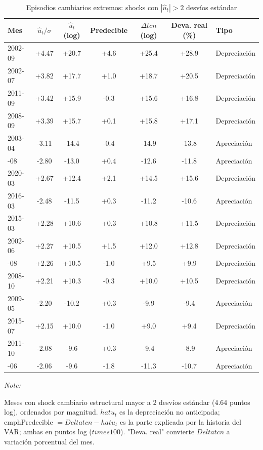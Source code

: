 \begin{table}[!h]
\centering
\caption{\label{tab:episodios}Episodios cambiarios extremos: shocks con $|\hat u_t| > 2$ desvíos estándar}
\centering
\fontsize{8}{10}\selectfont
\begin{threeparttable}
\begin{tabular}[t]{lcccccl}
\toprule
Mes & $\hat u_t/\sigma$ & $\hat u_t$ (log) & Predecible & $\Delta tcn$ (log) & Deva. real (\%) & Tipo\\
\midrule
2002-09 & +4.47 & +20.7 & +4.6 & +25.4 & +28.9 & Depreciación\\
2002-07 & +3.82 & +17.7 & +1.0 & +18.7 & +20.5 & Depreciación\\
2011-09 & +3.42 & +15.9 & -0.3 & +15.6 & +16.8 & Depreciación\\
2008-09 & +3.39 & +15.7 & +0.1 & +15.8 & +17.1 & Depreciación\\
2003-04 & -3.11 & -14.4 & -0.4 & -14.9 & -13.8 & Apreciación\\
\addlinespace
2002-08 & -2.80 & -13.0 & +0.4 & -12.6 & -11.8 & Apreciación\\
2020-03 & +2.67 & +12.4 & +2.1 & +14.5 & +15.6 & Depreciación\\
2016-03 & -2.48 & -11.5 & +0.3 & -11.2 & -10.6 & Apreciación\\
2015-03 & +2.28 & +10.6 & +0.3 & +10.8 & +11.5 & Depreciación\\
2002-06 & +2.27 & +10.5 & +1.5 & +12.0 & +12.8 & Depreciación\\
\addlinespace
2019-08 & +2.26 & +10.5 & -1.0 & +9.5 & +9.9 & Depreciación\\
2008-10 & +2.21 & +10.3 & -0.3 & +10.0 & +10.5 & Depreciación\\
2009-05 & -2.20 & -10.2 & +0.3 & -9.9 & -9.4 & Apreciación\\
2015-07 & +2.15 & +10.0 & -1.0 & +9.0 & +9.4 & Depreciación\\
2011-10 & -2.08 & -9.6 & +0.3 & -9.4 & -8.9 & Apreciación\\
\addlinespace
2016-06 & -2.06 & -9.6 & -1.8 & -11.3 & -10.7 & Apreciación\\
\bottomrule
\end{tabular}
\begin{tablenotes}
\item \textit{Note: } 
\item Meses con shock cambiario estructural mayor a 2 desvíos estándar (4.64 puntos log), ordenados por magnitud. $hat u_t$ es la depreciación no anticipada; emph{Predecible} $= Delta tcn - hat u_t$ es la parte explicada por la historia del VAR; ambas en puntos log ($times 100$). "Deva. real" convierte $Delta tcn$ a variación porcentual del mes.
\end{tablenotes}
\end{threeparttable}
\end{table}
